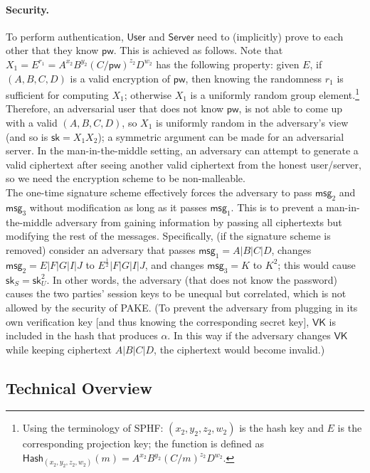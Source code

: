 \documentclass[12pt,a4paper]{article}
\newcommand{\user}{\mathsf{User}}
\newcommand{\sk}{\mathsf{sk}}
\newcommand{\pw}{\mathsf{pw}}
\newcommand{\VK}{\mathsf{VK}}
\newcommand{\server}{\mathsf{Server}}
\newcommand{\msg}[1]{\mathsf{msg}_{#1}}
\begin{document}
\paragraph{Security.}
To perform authentication, $\user$ and $\server$ need to (implicitly) prove to each other that they know $\pw$. This is achieved as follows. Note that $X_1 = E^{r_1} = A^{x_2}B^{y_2}(C/\pw)^{z_2}D^{w_2}$ has the following property: given $E$, if $(A,B,C,D)$ is a valid encryption of $\pw$, then knowing the randomness $r_1$ is sufficient for computing $X_1$; otherwise $X_1$ is a uniformly random group element.\footnote{Using the terminology of SPHF: $(x_2,y_2,z_2,w_2)$ is the hash key and $E$ is the corresponding projection key; the function is defined as $\mathsf{Hash}_{(x_2,y_2,z_2,w_2)}(m) = A^{x_2}B^{y_2}(C/m)^{z_2}D^{w_2}$.} Therefore, an adversarial user that does not know $\pw$, is not able to come up with a valid $(A,B,C,D)$, so $X_1$ is uniformly random in the adversary's view (and so is $\sk = X_1X_2$); a symmetric argument can be made for an adversarial server. In the man-in-the-middle setting, an adversary can attempt to generate a valid ciphertext after seeing another valid ciphertext from the honest user/server, so we need the encryption scheme to be non-malleable.\\

The one-time signature scheme effectively forces the adversary to pass $\msg{2}$ and $\msg{3}$ without modification as long as it passes $\msg{1}$. This is to prevent a man-in-the-middle adversary from gaining information by passing all ciphertexts but modifying the rest of the messages. Specifically, (if the signature scheme is removed) consider an adversary that passes $\msg{1} = A|B|C|D$, changes $\msg{2} = E|F|G|I|J$ to $E^{\frac{1}{2}}|F|G|I|J$, and changes $\msg{3} = K$ to $K^2$; this would cause $\sk_S = \sk_U^2$. In other words, the adversary (that does not know the password) causes the two parties' session keys to be unequal but correlated, which is not allowed by the security of PAKE. (To prevent the adversary from plugging in its own verification key [and thus knowing the corresponding secret key], $\VK$ is included in the hash that produces $\alpha$. In this way if the adversary changes $\VK$ while keeping ciphertext $A|B|C|D$, the ciphertext would become invalid.)
	
	\subsection{Technical Overview}
\end{document}
